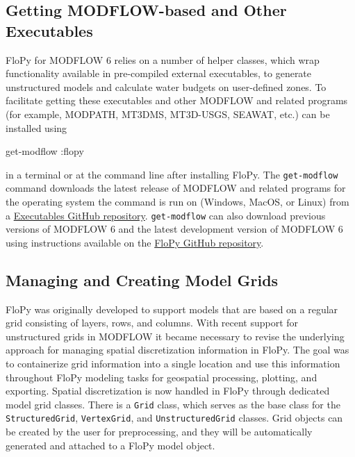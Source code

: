 \documentclass[11pt, oneside]{article}  	%
\begin{document}
\subsection{Getting MODFLOW-based and Other Executables}

FloPy for MODFLOW 6 relies on a number of helper classes, which wrap functionality available in pre-compiled external executables, to generate unstructured models and calculate water budgets on user-defined zones. To facilitate getting these executables and other MODFLOW and related programs (for example, MODPATH, MT3DMS, MT3D-USGS, SEAWAT, etc.) can be installed using

\begin{terminal}
get-modflow :flopy
\end{terminal}

\noindent in a terminal or at the command line after installing FloPy. The \texttt{get-modflow} command downloads the latest release of MODFLOW and related programs for the operating system the command is run on (Windows, MacOS, or Linux) from a \href{https://github.com/MODFLOW-USGS/executables}{Executables GitHub repository}. \texttt{get-modflow} can also download previous versions of MODFLOW 6 and the latest development version of MODFLOW 6 using instructions available on the \href{https://github.com/modflowpy/flopy/blob/develop/docs/get_modflow.md}{FloPy GitHub repository}.

\subsection{Managing and Creating Model Grids}

FloPy was originally developed to support models that are based on a regular grid consisting of layers, rows, and columns. With recent support for unstructured grids in MODFLOW \citep{modflowusg, modflow6gwf} it became necessary to revise the underlying approach for managing spatial discretization information in FloPy. The goal was to containerize grid information into a single location and use this information throughout FloPy modeling tasks for geospatial processing, plotting, and exporting. Spatial discretization is now handled in FloPy through dedicated model grid classes. There is a \texttt{Grid} class, which serves as the base class for the \texttt{StructuredGrid}, \texttt{VertexGrid}, and \texttt{UnstructuredGrid} classes. Grid objects can be created by the user for preprocessing, and they will be automatically generated and attached to a FloPy model object.
\end{document}
